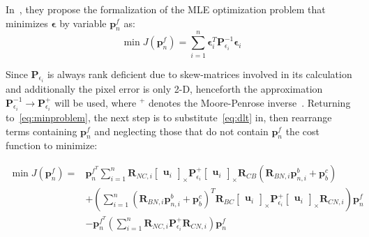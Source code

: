 In~\cite{absolute-triangulation}, they propose the formalization of the MLE optimization problem that minimizes $\boldsymbol{\epsilon}$ by variable $\mathbf{p}_n^f$ as:
\begin{equation}
    \min J(\mathbf{p}_n^f)=\sum_{i=1}^n\boldsymbol{\epsilon}_i^T\mathbf{P}_{\epsilon_i}^{-1}\boldsymbol{\epsilon}_i
    \label{eq:minproblem}
\end{equation}

Since $\mathbf{P}_{\epsilon_i}$ is always rank deficient due to skew-matrices involved in its calculation and additionally the pixel error is only 2-D, henceforth the approximation $\mathbf{P}_{\epsilon_i}^{-1}\rightarrow\mathbf{P}_{\epsilon_i}^{+}$ will be used, where $^+$ denotes the Moore-Penrose inverse~\cite{moorepenrose}. Returning to~\eqref{eq:minproblem}, the next step is to substitute~\eqref{eq:dlt} in, then rearrange terms containing $\mathbf{p}_n^f$ and neglecting those that do not contain $\mathbf{p}_n^f$ the cost function to minimize:

\begin{equation}
\begin{aligned}
    \min J(\mathbf{p}_n^f) = & \mathbf{p}_n^{f^T}\sum_{i=1}^n \mathbf{R}_{NC, i}\begin{bmatrix}
        \mathbf{u}_i
    \end{bmatrix}_\times \mathbf{P}_{\epsilon_i}^{+} 
    \begin{bmatrix}
        \mathbf{u}_i
    \end{bmatrix}_\times
    \mathbf{R}_{CB}(\mathbf{R}_{BN, i}\mathbf{p}_{n, i}^b + \mathbf{p}_b^c) \\ &
     + \left(\sum_{i=1}^n{(\mathbf{R}_{BN, i}\mathbf{p}_{n, i}^b + \mathbf{p}_b^c)}^T\mathbf{R}_{BC}
    \begin{bmatrix}
        \mathbf{u}_i
    \end{bmatrix}_\times \mathbf{P}_{\epsilon_i}^{+}
    \begin{bmatrix}
        \mathbf{u}_i
    \end{bmatrix}_\times \mathbf{R}_{CN, i}\right) \mathbf{p}_n^f \\ &
    -\mathbf{p}_n^{f^T}\left( \sum_{i=1}^n \mathbf{R}_{NC, i}\mathbf{P}_{\epsilon_i}^{+}\mathbf{R}_{CN, i}\right)\mathbf{p}_n^f
\end{aligned}
\label{eq:costfunc}
\end{equation}

